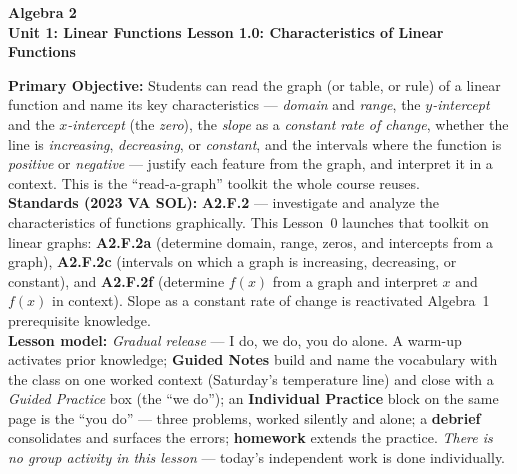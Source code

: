 \documentclass[10pt]{article}
\newcommand{\CourseName}{Algebra 2}
\newcommand{\UnitNumberName}{Unit 1: Linear Functions \quad}
\newcommand{\LessonNumberName}{Lesson 1.0: Characteristics of Linear Functions}
\begin{document}
\begin{center}
    {\Large\bfseries \CourseName \\
    {\small\bfseries \UnitNumberName \LessonNumberName}}
\end{center}

\begin{tcolorbox}[colback=forestbg, colframe=forest, boxrule=0.9pt, arc=2mm,
    left=2mm, right=2mm, top=1.5mm, bottom=1.5mm]
    \textbf{Primary Objective:} Students can read the graph (or table, or rule) of a linear function
    and name its key characteristics --- \emph{domain} and \emph{range}, the \emph{$y$-intercept} and
    the \emph{$x$-intercept} (the \emph{zero}), the \emph{slope} as a \emph{constant rate of change},
    whether the line is \emph{increasing}, \emph{decreasing}, or \emph{constant}, and the intervals
    where the function is \emph{positive} or \emph{negative} --- justify each feature from the graph,
    and interpret it in a context. This is the ``read-a-graph'' toolkit the whole course reuses.
    \\[2pt]
    \textbf{Standards (2023 VA SOL):} \textbf{A2.F.2} --- investigate and analyze the characteristics
    of functions graphically. This Lesson~0 launches that toolkit on linear graphs:
    \textbf{A2.F.2a} (determine domain, range, zeros, and intercepts from a graph),
    \textbf{A2.F.2c} (intervals on which a graph is increasing, decreasing, or constant), and
    \textbf{A2.F.2f} (determine $f(x)$ from a graph and interpret $x$ and $f(x)$ in context). Slope
    as a constant rate of change is reactivated Algebra~1 prerequisite knowledge.
    \\[2pt]
    \textbf{Lesson model:} \emph{Gradual release} --- I do, we do, you do alone. A warm-up
    activates prior knowledge; \textbf{Guided Notes} build and name the vocabulary with the class
    on one worked context (Saturday's temperature line) and close with a \emph{Guided Practice}
    box (the ``we do''); an \textbf{Individual Practice} block on the same page is the ``you do''
    --- three problems, worked silently and alone; a \textbf{debrief} consolidates and surfaces
    the errors; \textbf{homework} extends the practice. \emph{There is no group activity in this
    lesson} --- today's independent work is done individually.
\end{tcolorbox}
\end{document}
